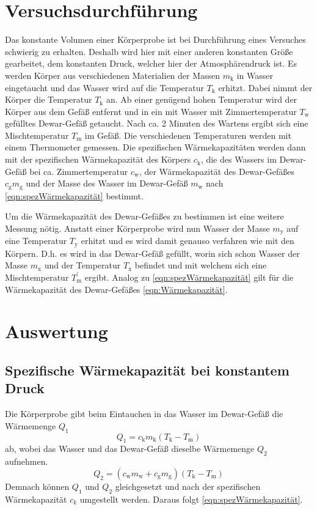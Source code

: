 \documentclass[titlepage = firstcover]{scrartcl}
\begin{document}
    \section{Versuchsdurchführung}
        Das konstante Volumen einer Körperprobe ist bei Durchführung eines Versuches schwierig zu erhalten.
        Deshalb wird hier mit einer anderen konstanten Größe gearbeitet, dem konstanten Druck, welcher hier
        der Atmosphärendruck ist. Es werden Körper aus verschiedenen Materialien der Massen $m_\text{k}$ in Wasser
        eingetaucht und das Wasser wird auf die Temperatur $T_\text{k}$ erhitzt. Dabei nimmt der Körper die Temperatur $T_\text{k}$ an. Ab einer genügend hohen Temperatur
        wird der Körper aus dem Gefäß entfernt und in ein mit Wasser mit Zimmertemperatur $T_\text{w}$ gefülltes
        Dewar-Gefäß getaucht. Nach ca. 2 Minuten des Wartens ergibt sich eine Mischtemperatur $T_\text{m}$ im Gefäß.
        Die verschiedenen Temperaturen werden mit einem Thermometer gemessen.
        Die spezifischen Wärmekapazitäten werden dann mit der spezifischen Wärmekapazität des Körpers $c_\text{k}$, die des Wassers im Dewar-Gefäß bei ca. Zimmertemperatur
        $c_\text{w}$, der Wärmekapazität des Dewar-Gefäßes $c_\text{g}m_\text{g}$ und der Masse des Wasser im Dewar-Gefäß
        $m_\text{w}$ nach \eqref{eqn:spezWärmekapazität} bestimmt.
        
        \noindent
        Um die Wärmekapazität des Dewar-Gefäßes zu bestimmen ist eine weitere Messung nötig. Anstatt einer Körperprobe
        wird nun Wasser der Masse $m_\text{y}$ auf eine Temperatur $T_\text{y}$ erhitzt und es wird damit genauso verfahren wie mit den Körpern.
        D.h. es wird in das Dewar-Gefäß gefüllt, worin sich schon Wasser der Masse $m_\text{x}$ und der Temperatur
        $T_\text{x}$ befindet und mit welchem sich eine Mischtemperatur $T_\text{m}^{'}$ ergibt. Analog zu
        \eqref{eqn:spezWärmekapazität} gilt für die Wärmekapazität des Dewar-Gefäßes \eqref{eqn:Wärmekapazität}.
    

    \section{Auswertung}
        \subsection{Spezifische Wärmekapazität bei konstantem Druck}
            Die Körperprobe gibt beim Eintauchen in das Wasser im Dewar-Gefäß die Wärmemenge $Q_1$
            \begin{equation*}
                Q_1 = c_\text{k}m_\text{k}(T_\text{k} - T_\text{m})
            \end{equation*}
            ab, wobei das Wasser und das Dewar-Gefäß dieselbe Wärmemenge $Q_2$ aufnehmen.
            \begin{equation*}
                Q_2 = (c_\text{w}m_\text{w} + c_\text{g}m_\text{g})(T_\text{k} - T_\text{m})
            \end{equation*}
            Demnach können $Q_1$ und $Q_2$ gleichgesetzt und nach der spezifischen Wärmekapazität $c_k$ umgestellt werden. Daraus folgt \eqref{eqn:spezWärmekapazität}.
            
\end{document}
